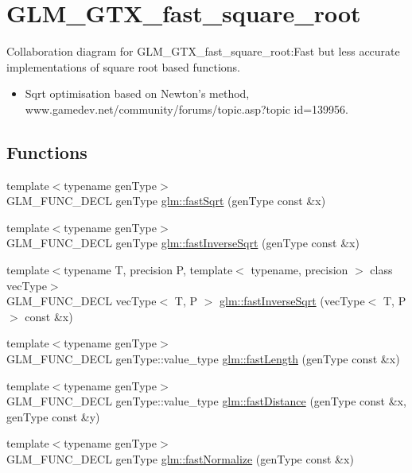 \hypertarget{group__gtx__fast__square__root}{
\section{GLM\_\-GTX\_\-fast\_\-square\_\-root}
\label{group__gtx__fast__square__root}
}


Collaboration diagram for GLM\_\-GTX\_\-fast\_\-square\_\-root:Fast but less accurate implementations of square root based functions.\begin{itemize}
\item Sqrt optimisation based on Newton's method, www.gamedev.net/community/forums/topic.asp?topic id=139956. \end{itemize}
 
\subsection*{Functions}
\begin{CompactItemize}
\item 
{\footnotesize template$<$typename genType$>$ }\\GLM\_\-FUNC\_\-DECL genType \hyperlink{group__gtx__fast__square__root_g4a192efe46a74d13ab40067f7e3714e3}{glm::fastSqrt} (genType const \&x)
\item 
{\footnotesize template$<$typename genType$>$ }\\GLM\_\-FUNC\_\-DECL genType \hyperlink{group__gtx__fast__square__root_g38b3acc3e6a37b2e6f78e2bb29585047}{glm::fastInverseSqrt} (genType const \&x)
\item 
{\footnotesize template$<$typename T, precision P, template$<$ typename, precision $>$ class vecType$>$ }\\GLM\_\-FUNC\_\-DECL vecType$<$ T, P $>$ \hyperlink{group__gtx__fast__square__root_ge34c9d81e02deb1042789aa4dc98cfc9}{glm::fastInverseSqrt} (vecType$<$ T, P $>$ const \&x)
\item 
{\footnotesize template$<$typename genType$>$ }\\GLM\_\-FUNC\_\-DECL genType::value\_\-type \hyperlink{group__gtx__fast__square__root_g49395da3932ad3f2b33d6b874aa1de0d}{glm::fastLength} (genType const \&x)
\item 
{\footnotesize template$<$typename genType$>$ }\\GLM\_\-FUNC\_\-DECL genType::value\_\-type \hyperlink{group__gtx__fast__square__root_g38aff4a231786efed3482b015da34b66}{glm::fastDistance} (genType const \&x, genType const \&y)
\item 
{\footnotesize template$<$typename genType$>$ }\\GLM\_\-FUNC\_\-DECL genType \hyperlink{group__gtx__fast__square__root_g06fee9a90e853107e9d70d690dccf478}{glm::fastNormalize} (genType const \&x)
\end{CompactItemize}


